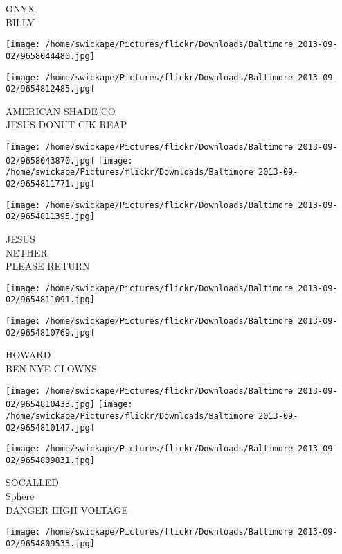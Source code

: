 \documentclass[10pt,letterpaper]{article}
\begin{document}
ONYX\\
BILLY\\
\pagebreak

\texttt{[image: /home/swickape/Pictures/flickr/Downloads/Baltimore 2013-09-02/9658044480.jpg]}

\vspace{0.25in}
\texttt{[image: /home/swickape/Pictures/flickr/Downloads/Baltimore 2013-09-02/9654812485.jpg]}

AMERICAN SHADE CO\\
JESUS DONUT CIK REAP\\
\pagebreak

\texttt{[image: /home/swickape/Pictures/flickr/Downloads/Baltimore 2013-09-02/9658043870.jpg]}
\texttt{[image: /home/swickape/Pictures/flickr/Downloads/Baltimore 2013-09-02/9654811771.jpg]}

\vspace{0.25in}
\texttt{[image: /home/swickape/Pictures/flickr/Downloads/Baltimore 2013-09-02/9654811395.jpg]}

JESUS\\
NETHER\\
PLEASE RETURN\\
\pagebreak

\texttt{[image: /home/swickape/Pictures/flickr/Downloads/Baltimore 2013-09-02/9654811091.jpg]}

\vspace{0.25in}
\texttt{[image: /home/swickape/Pictures/flickr/Downloads/Baltimore 2013-09-02/9654810769.jpg]}

HOWARD\\
BEN NYE CLOWNS\\
\pagebreak

\texttt{[image: /home/swickape/Pictures/flickr/Downloads/Baltimore 2013-09-02/9654810433.jpg]}
\texttt{[image: /home/swickape/Pictures/flickr/Downloads/Baltimore 2013-09-02/9654810147.jpg]}

\texttt{[image: /home/swickape/Pictures/flickr/Downloads/Baltimore 2013-09-02/9654809831.jpg]}

SOCALLED\\
Sphere\\
DANGER HIGH VOLTAGE\\
\pagebreak

\texttt{[image: /home/swickape/Pictures/flickr/Downloads/Baltimore 2013-09-02/9654809533.jpg]}
\end{document}
